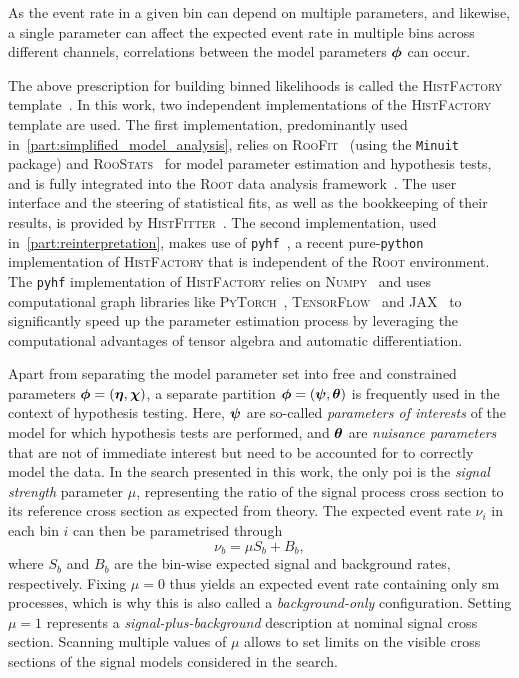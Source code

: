As the event rate in a given bin can depend on multiple parameters, and likewise, a single parameter can affect the expected event rate in multiple bins across different channels, correlations between the model parameters $\makemebold{\phi}$ can occur.

The above prescription for building binned likelihoods is called the \textsc{HistFactory} template~\cite{Cranmer:1456844}. In this work, two independent implementations of the \textsc{HistFactory} template are used.
The first implementation, predominantly used in~\cref{part:simplified_model_analysis}, relies on \textsc{RooFit}~\cite{RooFit:2003ir} (using the \texttt{Minuit}~\cite{James:310399} package) and \textsc{RooStats}~\cite{RooStats:2010pm} for model parameter estimation and hypothesis tests, and is fully integrated into the \textsc{Root} data analysis framework~\cite{ROOT:1997pa,ROOT-2}. The user interface and the steering of statistical fits, as well as the bookkeeping of their results, is provided by \textsc{HistFitter}~\cite{HistFitter:2014wma}.
The second implementation, used in~\cref{part:reinterpretation}, makes use of \texttt{pyhf}~\cite{pyhf_joss,pyhf}, a recent pure-\texttt{python} implementation of \textsc{HistFactory} that is independent of the \textsc{Root} environment.
The \texttt{pyhf} implementation of \textsc{HistFactory} relies on \textsc{Numpy}~\cite{numpy} and uses computational graph libraries like \textsc{PyTorch}~\cite{pytorch}, \textsc{TensorFlow}~\cite{tensorflow2015-whitepaper} and \textsc{JAX}~\cite{jax2018github} to significantly speed up the parameter estimation process by leveraging the computational advantages of tensor algebra and automatic differentiation.
 
Apart from separating the model parameter set into free and constrained parameters $\makemebold{\phi} = (\makemebold{\eta},\makemebold{\chi})$, a separate partition $\makemebold{\phi} = (\makemebold{\psi},\makemebold{\theta})$ is frequently used in the context of hypothesis testing.
Here, $\makemebold{\psi}$ are so-called \textit{parameters of interests} of the model for which hypothesis tests are performed, and $\makemebold{\theta}$ are \textit{nuisance parameters} that are not of immediate interest but need to be accounted for to correctly model the data.
In the search presented in this work, the only \gls{poi} is the \textit{signal strength} parameter $\mu$, representing the ratio of the signal process cross section to its reference cross section as expected from theory.
The expected event rate $\nu_i$ in each bin $i$ can then be parametrised through
\begin{equation}
	\nu_b = \mu S_b + B_b,
\end{equation}
where $S_b$ and $B_b$ are the bin-wise expected signal and background rates, respectively. Fixing $\mu = 0$ thus yields an expected event rate containing only \gls{sm} processes, which is why this is also called a \textit{background-only} configuration. Setting $\mu = 1$ represents a \textit{signal-plus-background} description at nominal signal cross section. Scanning multiple values of $\mu$ allows to set limits on the visible cross sections of the signal models considered in the search. 
  
